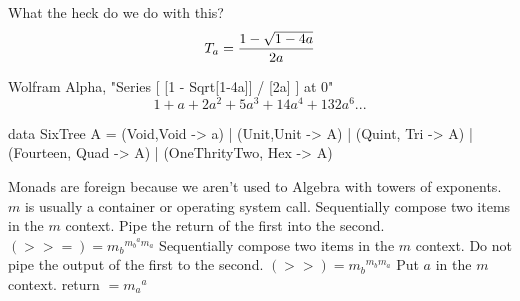 \documentclass{beamer}
\begin{document}
\begin{frame}[fragile]
What the heck do we do with this? %
$$T_{a} = {1 - \sqrt {1 - 4a} \over 2a}$$

Wolfram Alpha, "Series [ [1 - Sqrt[1-4a]] / [2a] ] at 0"
$$1+a+2a^{2}+5a^{3} + 14a^{4} + 132a^{6}...$$
\begin{code}
data SixTree A = (Void,Void -> a)  | (Unit,Unit -> A) 
   | (Quint, Tri -> A) | (Fourteen, Quad -> A)
   | (OneThrityTwo, Hex -> A) 
\end{code}
\end{frame}

\begin{frame}[fragile]
Monads are foreign because we aren't used to Algebra with towers of exponents. $m$ is usually a container or operating system call.\newline\newline
Sequentially compose two items in the $m$ context. Pipe the return of the first into the second.\newline
$(>>=) = {m_b}^{ {m_b}^{a}m_a} $\newline\newline
Sequentially compose two items in the $m$ context. Do not pipe the output of the first to the second.\newline
$(>>) = {m_b}^{m_b m_a}$\newline\newline
Put $a$ in the $m$ context.\newline
return $= {m_a}^{a}$\newline\newline
\end{frame}


\begin{frame}[fragile]


\end{frame}
\end{document}
